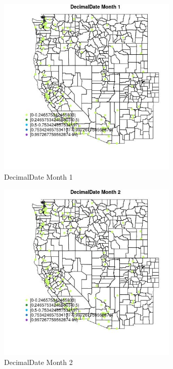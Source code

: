 \begin{figure} 
\centering  
\includegraphics[width=0.77\textwidth]{Code_Outputs/Report_ML_input_PM25_Step4_part_e_de_duplicated_aves_MapObsMo1DecimalDate.jpg} 
\caption{\label{fig:Report_ML_input_PM25_Step4_part_e_de_duplicated_avesMapObsMo1DecimalDate}DecimalDate Month 1} 
\end{figure} 
 

\begin{figure} 
\centering  
\includegraphics[width=0.77\textwidth]{Code_Outputs/Report_ML_input_PM25_Step4_part_e_de_duplicated_aves_MapObsMo2DecimalDate.jpg} 
\caption{\label{fig:Report_ML_input_PM25_Step4_part_e_de_duplicated_avesMapObsMo2DecimalDate}DecimalDate Month 2} 
\end{figure} 
 

